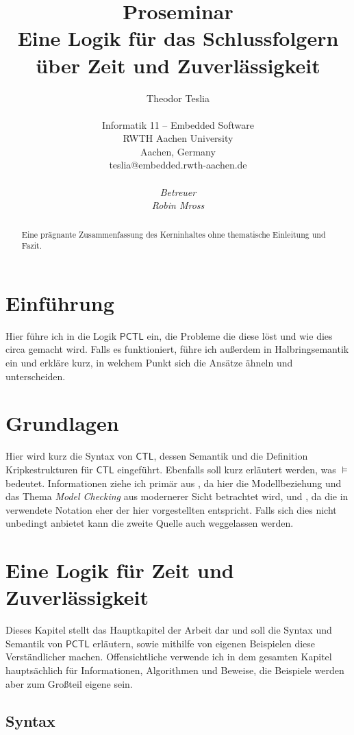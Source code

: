 \documentclass{lni}
\author{
	Theodor Teslia \\ 
	\\ 
	Informatik 11 -- Embedded Software \\ 
	RWTH Aachen University \\ 
	Aachen, Germany \\ 
	teslia@embedded.rwth-aachen.de\\
	\\
	\textit{Betreuer}\\
	\textit{Robin Mross}\\ %
}
\title{\small{Proseminar} \\ \vspace{0.5cm} \Large{Eine Logik für das Schlussfolgern über Zeit und Zuverlässigkeit}}
\newcommand{\CTL}{\mathsf{CTL}}
\newcommand{\PCTL}{\mathsf{PCTL}}
\begin{document}
\maketitle

\begin{abstract}
Eine prägnante Zusammenfassung des Kerninhaltes ohne thematische Einleitung und Fazit. 
\end{abstract}

\section{Einführung}

Hier führe ich in die Logik $\PCTL$ ein, die Probleme die diese löst und wie dies circa gemacht wird.
Falls es funktioniert, führe ich außerdem in Halbringsemantik ein und erkläre kurz, in welchem Punkt sich die Ansätze ähneln und unterscheiden.

\section{Grundlagen}

Hier wird kurz die Syntax von $\CTL$, dessen Semantik und die Definition Kripkestrukturen für $\CTL$ eingeführt. Ebenfalls soll kurz erläutert werden, was $\models$ bedeutet. Informationen ziehe ich primär aus \cite{baier2008principles}, da hier die Modellbeziehung und das Thema \textit{Model Checking} aus modernerer Sicht betrachtet wird, und \cite{clarke1981design}, da die in \cite{hansson1994logic} verwendete Notation eher der hier vorgestellten entspricht. Falls sich dies nicht unbedingt anbietet kann die zweite Quelle auch weggelassen werden.

\section{Eine Logik für Zeit und Zuverlässigkeit}

Dieses Kapitel stellt das Hauptkapitel der Arbeit dar und soll die Syntax und Semantik von $\PCTL$ erläutern, sowie mithilfe von eigenen Beispielen diese Verständlicher machen. Offensichtliche verwende ich in dem gesamten Kapitel hauptsächlich \cite{hansson1994logic} für Informationen, Algorithmen und Beweise, die Beispiele werden aber zum Großteil eigene sein.

\subsection{Syntax}
\end{document}
